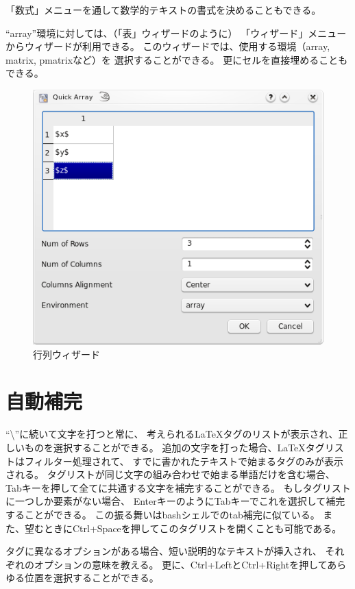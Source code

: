 「数式」メニューを通して数学的テキストの書式を決めることもできる。

``array''環境に対しては、（「表」ウィザードのように）
「ウィザード」メニューからウィザードが利用できる。
このウィザードでは、使用する環境（array, matrix, pmatrixなど）を
選択することができる。
更にセルを直接埋めることもできる。

\begin{figure}[H]
  \centering
  \includegraphics{doc13.png}
  \caption{行列ウィザード}
\end{figure}

\section{自動補完}

``\textbackslash{}''に続いて文字を打つと常に、
考えられるLaTeXタグのリストが表示され、正しいものを選択することができる。
追加の文字を打った場合、LaTeXタグリストはフィルター処理されて、
すでに書かれたテキストで始まるタグのみが表示される。
タグリストが同じ文字の組み合わせで始まる単語だけを含む場合、
Tabキーを押して全てに共通する文字を補完することができる。
もしタグリストに一つしか要素がない場合、
EnterキーのようにTabキーでこれを選択して補完することができる。
この振る舞いはbashシェルでのtab補完に似ている。
また、望むときにCtrl+Spaceを押してこのタグリストを開くことも可能である。

タグに異なるオプションがある場合、短い説明的なテキストが挿入され、
それぞれのオプションの意味を教える。
更に、Ctrl+LeftとCtrl+Rightを押してあらゆる位置を選択することができる。

